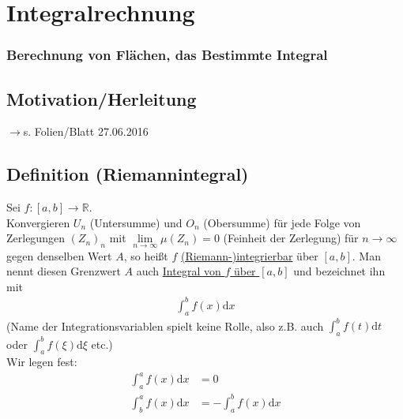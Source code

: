 \documentclass[12pt, titlepage]{article}
\newcommand{\R}{\mathds{R}}
\newcommand{\infn}{n\rightarrow\infty}
\renewcommand{\>}{\rightarrow}
\renewcommand{\*}{\cdot}
\begin{document}
	\section{Integralrechnung}
	\subsubsection*{Berechnung von Flächen, das Bestimmte Integral}
	\subsection{Motivation/Herleitung}
	$\>$s. Folien/Blatt 27.06.2016
	\subsection{Definition (Riemannintegral)}
	Sei $f\colon[a,b]\>\R$.\\
	Konvergieren $U_n$ (Untersumme) und $O_n$ (Obersumme) für jede Folge von Zerlegungen $(Z_n)_n$ mit $\lim\limits_{\infn}\mu(Z_n)=0$ (Feinheit der Zerlegung) für $\infn$ gegen denselben Wert $A$, so heißt $f$ \underline{(Riemann-)integrierbar} über $[a,b]$. Man nennt diesen Grenzwert $A$ auch \underline{Integral von $f$ über $[a,b]$} und bezeichnet ihn mit
	\begin{align*}
		\int_{a}^{b}f(x)\textrm{d}x
	\end{align*}
	(Name der Integrationsvariablen spielt keine Rolle, also z.B. auch $\int_{a}^{b}f(t)\textrm{d}t$ oder $\int_{a}^{b}f(\xi)\textrm{d}\xi$ etc.)\\
	Wir legen fest:
	\begin{align*}
		\int_{a}^{a}f(x)\textrm{d}x&=0\\
		\int_{b}^{a}f(x)\textrm{d}x&=-\int_{a}^{b}f(x)\textrm{d}x
	\end{align*}
\end{document}

